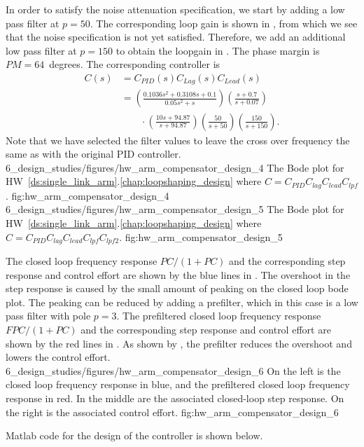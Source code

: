 In order to satisfy the noise attenuation specification, we start by adding a low pass filter at $p=50$.  The corresponding loop gain is shown in , from which we see that the noise specification is not yet satisfied.  Therefore, we add an additional low pass filter at $p=150$ to obtain the loopgain in .  The phase margin is $PM=64$~degrees. The corresponding controller is
\begin{align*}
C(s) &= C_{PID}(s)C_{Lag}(s)C_{Lead}(s) \\
     &=  \left(\frac{0.1036 s^2 + 0.3108 s + 0.1}{0.05 s^2 + s}\right)\left(\frac{s + 0.7}{s + 0.07}\right)
     \\ &\qquad\cdot
	\left(\frac{10 s + 94.87}{s + 94.87}\right)\left(\frac{50}{s+50}\right)\left(\frac{150}{s+150}\right).
\end{align*}
Note that we have selected the filter values to leave the cross over frequency the same as with the original PID controller.
	{6_design_studies/figures/hw_arm_compensator_design_4}
	{The Bode plot for HW~\ref{ds:single_link_arm}.\ref{chap:loopshaping_design} where $C=C_{PID}C_{lag}C_{lead}C_{lpf}$.}
	{fig:hw_arm_compensator_design_4}
	{6_design_studies/figures/hw_arm_compensator_design_5}
	{The Bode plot for HW~\ref{ds:single_link_arm}.\ref{chap:loopshaping_design} where $C=C_{PID}C_{lag}C_{lead}C_{lpf}C_{lpf2}$.}
	{fig:hw_arm_compensator_design_5}

The closed loop frequency response $PC/(1+PC)$ and the corresponding step response and control effort are shown by the blue lines in .  The overshoot in the step response is caused by the small amount of peaking on the closed loop bode plot.  The peaking can be reduced by adding a prefilter, which in this case is a low pass filter with pole $p=3$.   The prefiltered closed loop frequency response $FPC/(1+PC)$ and the corresponding step response and control effort are shown by the red lines in .  As shown by , the prefilter reduces the overshoot and lowers the control effort.
	{6_design_studies/figures/hw_arm_compensator_design_6}
	{On the left is the closed loop frequency response in blue, and the prefiltered closed loop frequency response in red.  In the middle are the associated closed-loop step response.  On the right is the associated control effort.}
	{fig:hw_arm_compensator_design_6}

Matlab code for the design of the controller is shown below.

%


